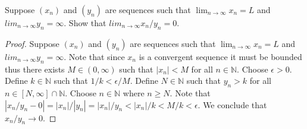 \documentclass[12pt]{article}
\makeatletter
\theoremstyle{homework}
\newenvironment{exercise}[1]
{\def\@currentlabel{#1}\exercisecore}
{\endexercisecore}
\makeatother
\begin{document}
\begin{exercise}
1
Suppose $(x_n)$ and $(y_n)$ are sequences such that $\lim_{n\rightarrow \infty} x_n = L$ and $lim_{n\rightarrow\infty} y_n =\infty$.  Show that $lim_{n\rightarrow\infty} x_n/y_n = 0$.
\end{exercise}
\begin{proof}
Suppose $(x_n)$ and $(y_n)$ are sequences such that $\lim_{n\rightarrow \infty} x_n = L$ and $lim_{n\rightarrow\infty} y_n =\infty$.  Note that since $x_n$ is a convergent sequence it must be bounded thus there exists $M\in(0,\infty)$ such that $|x_n|<M$ for all $n\in\mathbb{N}$.  Choose $\epsilon>0$.  Define $k\in\mathbb{N}$ such that $1/k<\epsilon/M$.  Define $N\in\mathbb{N}$ such that $y_n>k$ for all $n\in [N,\infty]\cap \mathbb{N}$.  Choose $n\in\mathbb{N}$ where $n\geq N$.  Note that $|x_n/y_n-0|=|x_n|/|y_n|=|x_n|/y_n<|x_n|/k<M/k<\epsilon$.  We conclude that $x_n/y_n\rightarrow 0$.
\end{proof}
\end{document}
